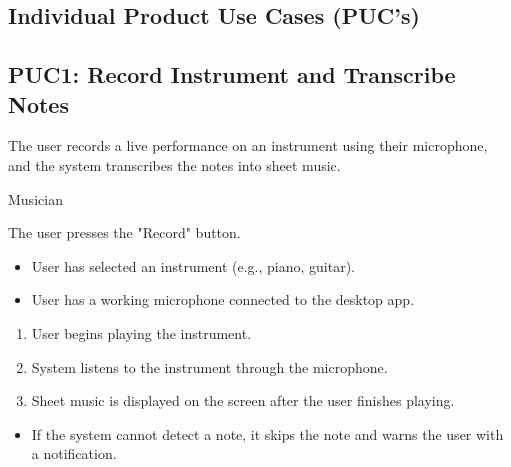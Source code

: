 \documentclass[12pt]{article}
\begin{document}
\subsection{Individual Product Use Cases (PUC's)}
\subsection*{PUC1: Record Instrument and Transcribe Notes}
\begin{description}[style=nextline]
    \item[Description:] The user records a live performance on an instrument using their microphone, and the system transcribes the notes into sheet music.
    \item[Primary Actor:] Musician
    \item[Trigger:] The user presses the "Record" button.
    \item[Preconditions:]
    \begin{itemize}
        \item User has selected an instrument (e.g., piano, guitar).
        \item User has a working microphone connected to the desktop app.
    \end{itemize}
    \item[Main Success Scenario:]
    \begin{enumerate}
        \item User begins playing the instrument.
        \item System listens to the instrument through the microphone.
        \item Sheet music is displayed on the screen after the user finishes playing.
    \end{enumerate}
    \item[Exceptions:]
    \begin{itemize}
        \item If the system cannot detect a note, it skips the note and warns the user with a notification.
    \end{itemize}
\end{description}
\end{document}
